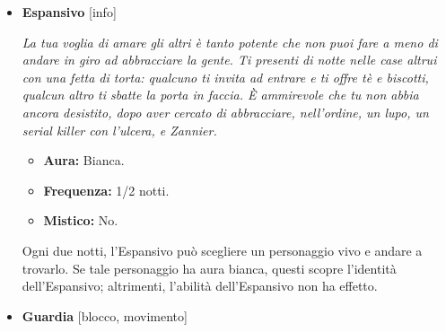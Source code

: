 \documentclass[a4paper,10pt]{article}
\begin{document}
\begin{itemize}
            \begin{multicols}{3}
                  \begin{itemize}
                        \item \textbf{Aura:} Bianca.
                        \item \textbf{Frequenza:} 1/notte.
                        \item \textbf{Mistico:} Sì.
                  \end{itemize}
            \end{multicols}

            Ogni notte, l'Esorcista può scegliere un personaggio, vivo o morto, e benedire la sua casa. Per quella notte i poteri utilizzati su tale personaggio non hanno effetto. Questa abilità non è influenzata da poteri.

            L'Esorcista scopre se ha annullato l'effetto di almeno un potere.

      \item \textbf{Espansivo} [info]

            \emph{La tua voglia di amare gli altri è tanto potente che non puoi fare a meno di andare in giro ad abbracciare la gente. Ti presenti di notte nelle case altrui con una fetta di torta: qualcuno ti invita ad entrare e ti offre tè e biscotti, qualcun altro ti sbatte la porta in faccia. È ammirevole che tu non abbia ancora desistito, dopo aver cercato di abbracciare, nell'ordine, un lupo, un serial killer con l'ulcera, e Zannier.}

            \begin{multicols}{3}
                  \begin{itemize}
                        \item \textbf{Aura:} Bianca.
                        \item \textbf{Frequenza:} 1/2 notti.
                        \item \textbf{Mistico:} No.
                  \end{itemize}
            \end{multicols}

            Ogni due notti, l'Espansivo può scegliere un personaggio vivo e andare a trovarlo. Se tale personaggio ha aura bianca, questi scopre l'identità dell'Espansivo; altrimenti, l'abilità dell'Espansivo non ha effetto.

      \item \textbf{Guardia} [blocco, movimento]


\end{itemize}
\end{document}
